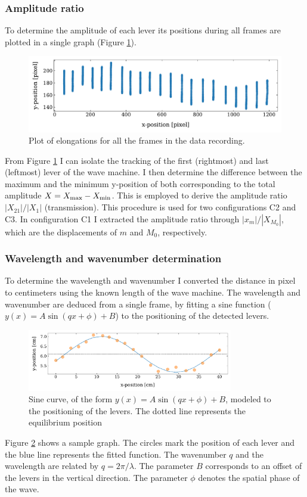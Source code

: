 \documentclass[12pt]{article}
\begin{document}
\subsubsection{Amplitude ratio}
To determine the amplitude of each lever its positions during all frames are plotted in a single graph (Figure \ref{fig:elongations}).
\begin{figure}[hbt]
  \includegraphics[width=.8\columnwidth]{amplitude}
  \caption{Plot of elongations for all the frames in the data recording.}\label{fig:elongations}
\end{figure}
From Figure \ref{fig:elongations} I can isolate the tracking of the first (rightmost) and last (leftmost) lever of the wave machine. I then determine the difference between the maximum and the minimum y-position of both corresponding to the total amplitude $X=X_{\rm max}-X_{\rm min}$. This is employed to derive the amplitude ratio $|X_{21}|/|X_1|$ (transmission). This procedure is used for two configurations C2 and C3. In configuration C1 I extracted the amplitude ratio through $|x_{m}|/|X_{M_{0}}|$, which are the displacements of $m$ and $M_0$, respectively.

\subsubsection{Wavelength and wavenumber determination}
To determine the wavelength and wavenumber I converted the distance in pixel to centimeters using the known length of the wave machine. The wavelength and wavenumber are deduced from a single frame, by fitting a sine function ($y(x) = A\sin(qx + \phi) + B$) to the positioning of the detected levers. 
\begin{figure}[hbt]
  \includegraphics[width=0.8\textwidth]{wavelength_determination}
  \caption{Sine curve, of the form $y(x) = A\sin(qx + \phi) + B$, modeled to the positioning of the levers. The dotted line represents the equilibrium position}\label{fig:wavelength}
\end{figure}
Figure \ref{fig:wavelength} shows a sample graph. The circles mark the position of each lever and the blue line represents the fitted function. The wavenumber $q$ and the wavelength are related by $q = 2\pi/\lambda$. The parameter $B$ corresponds to an offset of the levers in the vertical direction. The parameter $\phi$  denotes the spatial phase of the wave. 
\end{document}
